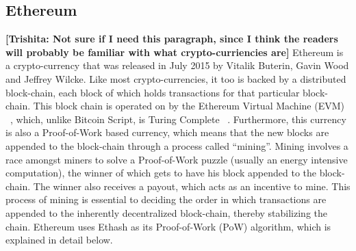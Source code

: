 \documentclass[10pt, conference, compsocconf]{IEEEtran}
\newcommand{\trishita}[1]{{\color{magenta}\bfseries[Trishita: #1]}}
\begin{document}

\subsection{Ethereum}
\trishita{Not sure if I need this paragraph, since I think the readers will probably be familiar with what crypto-curriencies are}
Ethereum is a crypto-currency that was released in July 2015 by Vitalik Buterin, Gavin Wood and Jeffrey Wilcke. Like most crypto-currencies, it too is backed by a distributed block-chain, each block of which holds transactions for that particular block-chain. This block chain is operated on by the Ethereum Virtual Machine (EVM) ~\cite{EVM}, which, unlike Bitcoin Script, is Turing Complete ~\cite{turingComplete}. Furthermore, this currency is also a Proof-of-Work based currency, which means that the new blocks are appended to the block-chain through a process called ``mining''. Mining involves a race amongst miners to solve a Proof-of-Work puzzle (usually an energy intensive computation), the winner of which gets to have his block appended to the block-chain. The winner also receives a payout, which acts as an incentive to mine. This process of mining is essential to deciding the order in which transactions are appended to the inherently decentralized block-chain, thereby stabilizing the chain. Ethereum uses Ethash as its Proof-of-Work (PoW) algorithm, which is explained in detail below.
\end{document}
